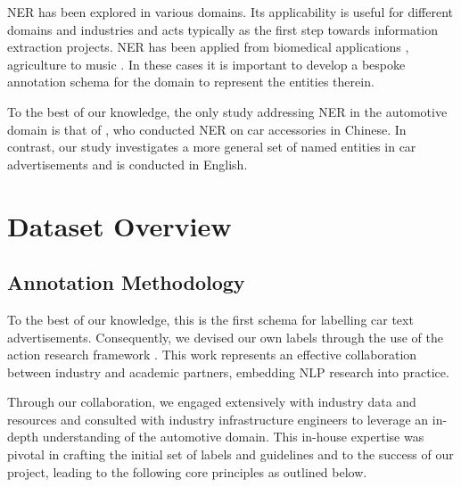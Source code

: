 \documentclass[11pt]{article}
\begin{document}
NER has been explored in various domains. Its applicability is useful for different domains and industries and acts typically as the first step towards information extraction projects. NER has been applied from biomedical applications \citep{fu-etal-2023-biomedical}, agriculture \citep{G2023120440} to music \citep{epure-hennequin-2023-human}. In these cases it is important to develop a bespoke annotation schema for the domain to represent the entities therein. 


To the best of our knowledge, the only study addressing NER in the automotive domain is that of \citet{10499162}, who conducted NER on car accessories in Chinese. In contrast, our study investigates a more general set of named entities in car advertisements and is conducted in English.


\section{Dataset Overview}
\label{sec:ner-schema}
\subsection{Annotation Methodology}

To the best of our knowledge, this is the first schema for labelling car text advertisements. Consequently, we devised our own labels through the use of the action research framework \citep{Molineux2018UsingAR}. This work represents an effective collaboration between industry and academic partners, embedding NLP research into practice. 


Through our collaboration, we engaged extensively with industry data and resources and consulted with industry infrastructure engineers to leverage an in-depth understanding of the automotive domain. This in-house expertise was pivotal in crafting the initial set of labels and guidelines and to the success of our project, leading to the following core principles as outlined below.
\end{document}
